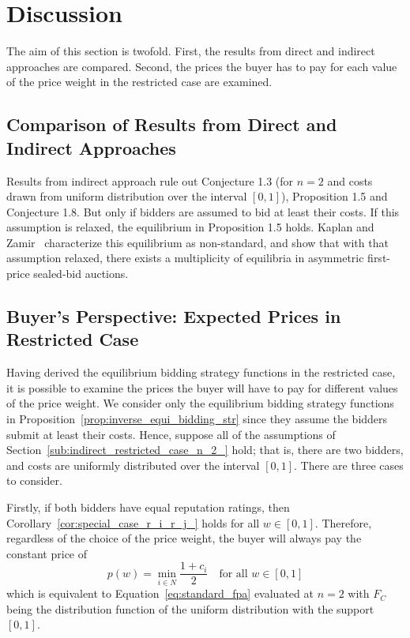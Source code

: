 \section{Discussion} %
\label{sec:discussion}
The aim of this section is twofold. First, the results from direct and indirect approaches are compared. Second, the prices the buyer has to pay for each value of the price weight in the restricted case are examined.

\subsection{Comparison of Results from Direct and Indirect Approaches} %
\label{sub:comparison_of_results_from_direct_and_indirect_approaches}
Results from indirect approach rule out Conjecture 1.3 (for $n=2$ and costs drawn from uniform distribution over the interval $[0,1]$), Proposition 1.5 and Conjecture 1.8. But only if bidders are assumed to bid at least their costs. If this assumption is relaxed, the equilibrium in Proposition 1.5 holds. Kaplan and Zamir~\cite{KaplanZamir2011} characterize this equilibrium as non-standard, and show that with that assumption relaxed, there exists a multiplicity of equilibria in asymmetric first-price sealed-bid auctions.

\subsection{Buyer's Perspective: Expected Prices in Restricted Case} %
\label{sub:buyer_s_perspective_expected_prices_in_restricted_case}
Having derived the equilibrium bidding strategy functions in the restricted case, it is possible to examine the prices the buyer will have to pay for different values of the price weight. We consider only the equilibrium bidding strategy functions in Proposition~\ref{prop:inverse_equi_bidding_str} since they assume the bidders submit at least their costs. Hence, suppose all of the assumptions of Section~\ref{sub:indirect_restricted_case_n_2_} hold; that is, there are two bidders, and costs are uniformly distributed over the interval $[0,1]$. There are three cases to consider.

Firstly, if both bidders have equal reputation ratings, then Corollary~\ref{cor:special_case_r_i_r_j_} holds for all $w\in [0,1]$. Therefore, regardless of the choice of the price weight, the buyer will always pay the constant price of
\begin{equation}
  \label{eq:price_at_w_1}
  p(w) = \min_{i\in N} \frac{1+c_i}{2} \quad\text{for all }w\in [0,1]
\end{equation}
which is equivalent to Equation~\eqref{eq:standard_fpa} evaluated at $n=2$ with $F_C$ being the distribution function of the uniform distribution with the support $[0,1]$.


